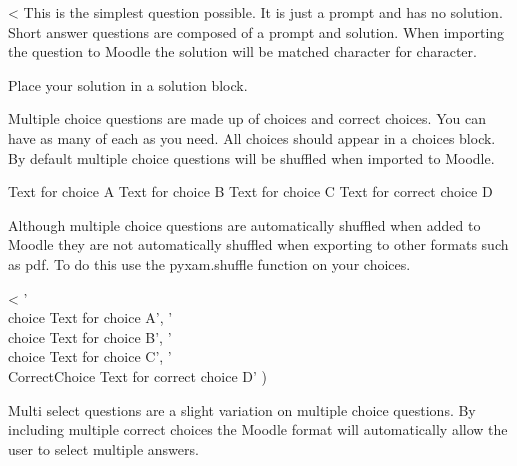 \documentclass[12pt]{exam}
\begin{document}
        \begin{questions}
            <%
                This is the simplest question possible. It is just a prompt and has no solution.
                Short answer questions are composed of a prompt and solution. When importing the question to Moodle the
                solution will be matched character for character.
                \begin{solution}
                    Place your solution in a solution block.
                \end{solution}
                Multiple choice questions are made up of choices and correct choices. You can have as many of each as
                you need. All choices should appear in a choices block. By default multiple choice questions will be
                shuffled when imported to Moodle.
                \begin{choices}
                    \choice Text for choice A
                    \choice Text for choice B
                    \choice Text for choice C
                    \CorrectChoice Text for correct choice D
                \end{choices}
                Although multiple choice questions are automatically shuffled when added to Moodle they are not
                automatically shuffled when exporting to other formats such as pdf. To do this use the pyxam.shuffle
                function on your choices.
                \begin{choices}
                    <%
                        '\\choice Text for choice A',
                        '\\choice Text for choice B',
                        '\\choice Text for choice C',
                        '\\CorrectChoice Text for correct choice D'
                    )%
                \end{choices}
                Multi select questions are a slight variation on multiple choice questions. By including multiple
                correct choices the Moodle format will automatically allow the user to select multiple answers.

\end{questions}
\end{document}
